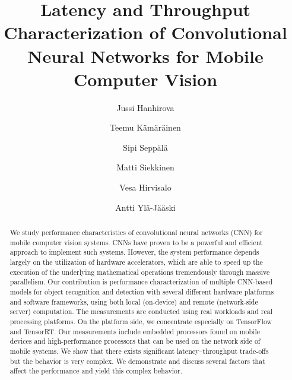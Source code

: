 \documentclass[sigconf]{acmart}
\begin{document}
\title{Latency and Throughput Characterization of Convolutional Neural Networks for Mobile Computer Vision}

\author{Jussi Hanhirova}

\author{Teemu K\"{a}m\"{a}r\"{a}inen}

\author{Sipi Sepp\"{a}l\"{a}}

\author{Matti Siekkinen}

\author{Vesa Hirvisalo}

\author{Antti Yl\"{a}-J\"{a}\"{a}ski}





\renewcommand{\shorttitle}{Latency and Throughput Characterization of CNNs for Mobile Computer Vision}

\begin{abstract}
We study performance characteristics of convolutional neural networks (CNN) for mobile computer vision systems. CNNs have proven to be a powerful and efficient approach to implement such systems. However, the system performance depends largely on the utilization of hardware accelerators, which are able to speed up the execution of the underlying mathematical operations tremendously through massive parallelism. Our contribution is performance characterization of multiple CNN-based models for object recognition and detection with several different hardware platforms and software frameworks, using both local (on-device) and remote (network-side server) computation. The measurements are conducted using real workloads and real processing platforms. On the platform side, we concentrate especially on TensorFlow and TensorRT. Our measurements include embedded processors found on mobile devices and high-performance processors that can be used on the network side of mobile systems. We show that there exists significant latency--throughput trade-offs but the behavior is very complex. We demonstrate and discuss several factors that affect the performance and yield this complex behavior.
\end{abstract}
\end{document}
